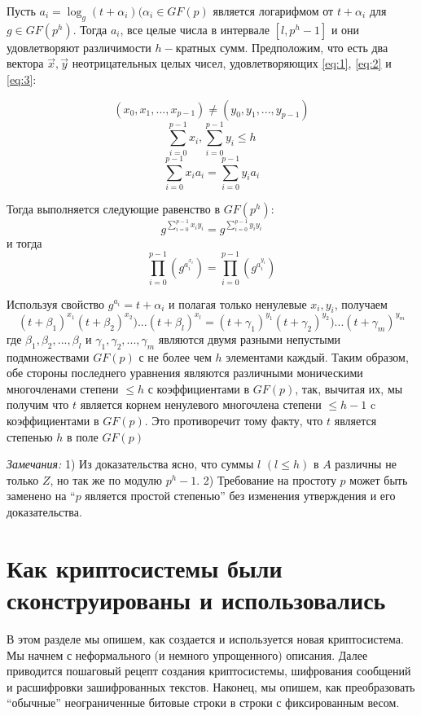 \documentclass[a4paper,12pt]{article}
\newcommand{\DL}{\newline\newline}
\begin{document}
Пусть $a_i = \log_g{(t + \alpha_i)} (\alpha_i \in GF(p)$ является логарифмом от $t + \alpha_i$ для $g \in GF(p^h).$ Тогда $a_i$, все целые числа в интервале $[l, p^h - 1]$ и они удовлетворяют различимости $h-$кратных сумм. Предположим, что есть два вектора $\Vec{x}, \Vec{y}$ неотрицательных целых чисел, удовлетворяющих \eqref{eq:1}, \eqref{eq:2} и \eqref{eq:3}:

\begin{equation}
(x_0, x_1, ... , x_{p-1}) \neq (y_0, y_1, ..., y_{p-1}) \label{eq:1} 
\end{equation} 
\begin{equation}
\sum_{i = 0}^{p-1}x_i, \sum_{i = 0}^{p-1}y_i \leq h \label{eq:2} 
\end{equation} 
\begin{equation}
\sum_{i = 0}^{p-1}x_i a_i = \sum_{i = 0}^{p-1}y_i a_i\label{eq:3} 
\end{equation} 

Тогда выполняется следующие равенство в $GF(p^h)$: \newline
$$g^{\sum_{i = 0}^{p-1}x_i y_i} = g^{\sum_{i = 0}^{p-1}y_i y_i}$$
и тогда 
$$ \prod_{i = 0}^{p-1}(g^{a_i^{x_i}}) = \prod_{i = 0}^{p-1}(g^{a_i^{y_i}}) $$

Используя свойство $g^{a_i} = t + \alpha_i$ и полагая только ненулевые $x_i, y_i$, получаем 
$$ (t+\beta_1)^{x_1}(t+\beta_2)^{x_2})...(t+\beta_l)^{x_l} = (t+\gamma_1)^{y_1}(t+\gamma_2)^{y_2})...(t+\gamma_m)^{y_m}$$
где ${\beta_1,\beta_2, ..., \beta_l}$ и ${\gamma_1,\gamma_2, ..., \gamma_m}$ являются двумя разными непустыми подмножествами $GF(p)$ с не более чем $h$ элементами каждый. Таким образом, обе стороны последнего уравнения являются различными моническими многочленами степени $\leq h$ с коэффициентами в $GF(p)$, так, вычитая их, мы получим что $t$ является корнем ненулевого многочлена степени $\leq h-1$ c коэффициентами в $GF(p)$. Это противоречит тому факту, что $t$ является степенью $h$ в поле $GF(p)$\newline

\textsl{Замечания:} 1) Из доказательства ясно, что суммы $l$ $(l \leq h)$ в $A$ различны не только $Z$, но так же по модулю $p^h - 1$. 2) Требование на простоту $p$ может быть заменено на “$p$ является простой степенью” без изменения утверждения и его доказательства.\DL

\section{Как криптосистемы были сконструированы и использовались}
В этом разделе мы опишем, как создается и используется новая криптосистема. Мы начнем с неформального (и немного упрощенного) описания. Далее приводится пошаговый рецепт создания криптосистемы, шифрования сообщений и расшифровки зашифрованных текстов. Наконец, мы опишем, как преобразовать “обычные” неограниченные битовые строки в строки с фиксированным весом. \newline
\end{document}
